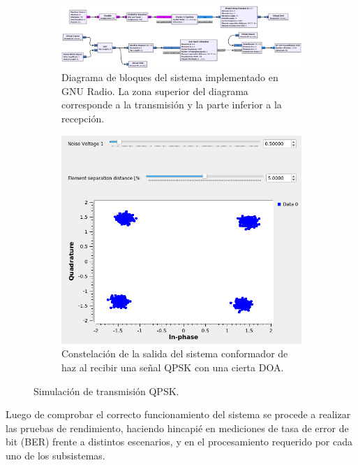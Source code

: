 \begin{figure}
    \centering
    \begin{subfigure}[b]{0.9\textwidth}
        \centering
        \includegraphics[width=\linewidth]{images/07-GNURadio/gr_sim0_comp.png}
        \caption{Diagrama de bloques del sistema implementado en GNU Radio. La zona superior del diagrama corresponde a la transmisión y la parte inferior a la recepción.}
        \label{fig:gr_sim0_companion}
    \end{subfigure}
    \hfill
    \begin{subfigure}[b]{0.4\textwidth}
        \centering
        \includegraphics[width=\linewidth]{images/07-GNURadio/gr_sim0_qt.png}
        \caption{Constelación de la salida del sistema conformador de haz al recibir una señal QPSK con una cierta DOA.}
        \label{fig:gr_sim0_qt}
    \end{subfigure}
    \caption{Simulación de transmisión QPSK.}
\end{figure}

Luego de comprobar el correcto funcionamiento del sistema se procede a realizar las pruebas de rendimiento, haciendo hincapié en mediciones de tasa de error de bit (BER) frente a distintos escenarios, y en el procesamiento requerido por cada uno de los subsistemas.

